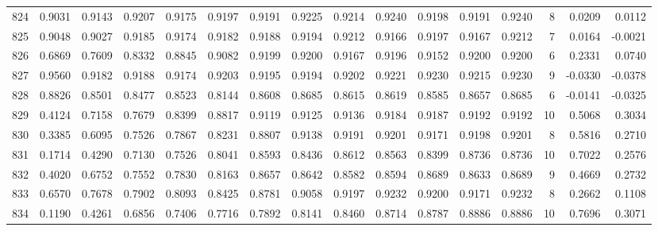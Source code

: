 \begin{tabular}{lrrrrrrrrrrrrrrr}
824 &      0.9031 &  0.9143 &  0.9207 &  0.9175 &  0.9197 &  0.9191 &  0.9225 &  0.9214 &  0.9240 &  0.9198 &   0.9191 &     0.9240 &      8 &                    0.0209 &                     0.0112 \\
825 &      0.9048 &  0.9027 &  0.9185 &  0.9174 &  0.9182 &  0.9188 &  0.9194 &  0.9212 &  0.9166 &  0.9197 &   0.9167 &     0.9212 &      7 &                    0.0164 &                    -0.0021 \\
826 &      0.6869 &  0.7609 &  0.8332 &  0.8845 &  0.9082 &  0.9199 &  0.9200 &  0.9167 &  0.9196 &  0.9152 &   0.9200 &     0.9200 &      6 &                    0.2331 &                     0.0740 \\
827 &      0.9560 &  0.9182 &  0.9188 &  0.9174 &  0.9203 &  0.9195 &  0.9194 &  0.9202 &  0.9221 &  0.9230 &   0.9215 &     0.9230 &      9 &                   -0.0330 &                    -0.0378 \\
828 &      0.8826 &  0.8501 &  0.8477 &  0.8523 &  0.8144 &  0.8608 &  0.8685 &  0.8615 &  0.8619 &  0.8585 &   0.8657 &     0.8685 &      6 &                   -0.0141 &                    -0.0325 \\
829 &      0.4124 &  0.7158 &  0.7679 &  0.8399 &  0.8817 &  0.9119 &  0.9125 &  0.9136 &  0.9184 &  0.9187 &   0.9192 &     0.9192 &     10 &                    0.5068 &                     0.3034 \\
830 &      0.3385 &  0.6095 &  0.7526 &  0.7867 &  0.8231 &  0.8807 &  0.9138 &  0.9191 &  0.9201 &  0.9171 &   0.9198 &     0.9201 &      8 &                    0.5816 &                     0.2710 \\
831 &      0.1714 &  0.4290 &  0.7130 &  0.7526 &  0.8041 &  0.8593 &  0.8436 &  0.8612 &  0.8563 &  0.8399 &   0.8736 &     0.8736 &     10 &                    0.7022 &                     0.2576 \\
832 &      0.4020 &  0.6752 &  0.7552 &  0.7830 &  0.8163 &  0.8657 &  0.8642 &  0.8582 &  0.8594 &  0.8689 &   0.8633 &     0.8689 &      9 &                    0.4669 &                     0.2732 \\
833 &      0.6570 &  0.7678 &  0.7902 &  0.8093 &  0.8425 &  0.8781 &  0.9058 &  0.9197 &  0.9232 &  0.9200 &   0.9171 &     0.9232 &      8 &                    0.2662 &                     0.1108 \\
834 &      0.1190 &  0.4261 &  0.6856 &  0.7406 &  0.7716 &  0.7892 &  0.8141 &  0.8460 &  0.8714 &  0.8787 &   0.8886 &     0.8886 &     10 &                    0.7696 &                     0.3071 \\

\end{tabular}
